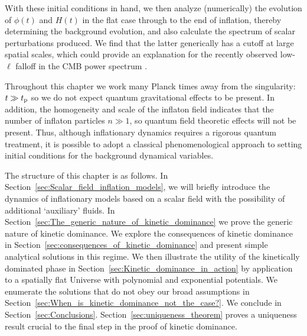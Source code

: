With these initial conditions in hand, we then analyze (numerically) the evolution of $\phi(t)$ and $H(t)$ in the flat case through to the end of inflation, thereby determining the background evolution, and also calculate the spectrum of scalar perturbations produced. We find that the latter generically has a cutoff at large spatial scales, which could provide an explanation for the recently observed low-$\ell$ falloff in the CMB power spectrum \citep{hinshaw_nine-year_2012,planck_collaboration_planck_2013}.
 
Throughout this chapter we work many Planck times away from the singularity: $t\gg t_{\mathrm{p}}$ so we do not expect quantum gravitational effects to be present.  In addition, the homogeneity and scale of the inflaton field indicates that the number of inflaton particles $n\gg1$, so quantum field theoretic effects will not be present.  Thus, although inflationary dynamics requires a rigorous quantum treatment, it is possible to adopt a classical phenomenological approach to setting initial conditions for the background dynamical variables.  

The structure of this chapter is as follows.  In Section~\ref{sec:Scalar_field_inflation_models}, we will briefly introduce the dynamics of inflationary models based on a scalar field with the possibility of additional `auxiliary' fluids.  In Section~\ref{sec:The_generic_nature_of_kinetic_dominance} we prove the generic nature of kinetic dominance.  We explore the consequences of kinetic dominance in Section~\ref{sec:consequences_of_kinetic_dominance} and present simple analytical solutions in this regime.  We then illustrate the utility of the kinetically dominated phase in Section~\ref{sec:Kinetic_dominance_in_action} by application to a spatially flat Universe with polynomial and exponential potentials.  We enumerate the solutions that do not obey our broad assumptions in Section~\ref{sec:When_is_kinetic_dominance_not_the_case?}.  We conclude in Section~\ref{sec:Conclusions}. Section~\ref{sec:uniqueness_theorem} proves a uniqueness result crucial to the final step in the proof of kinetic dominance.  

